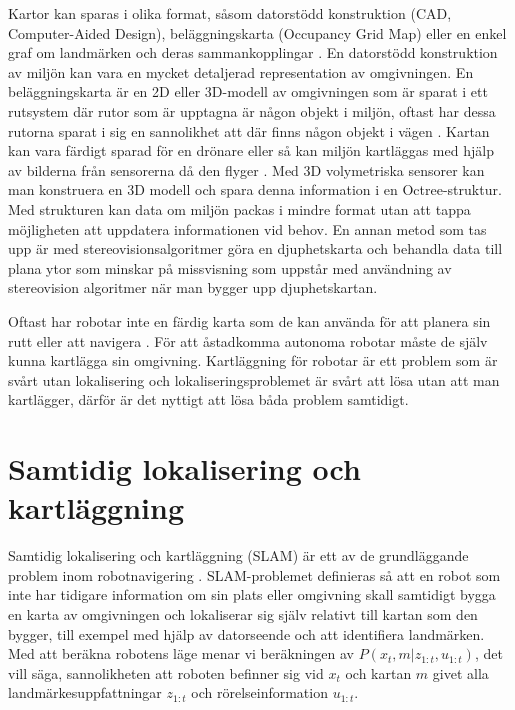 Kartor kan sparas i olika format, såsom datorstödd konstruktion (CAD, Computer-Aided Design), beläggningskarta (Occupancy Grid Map) eller en enkel graf om landmärken och deras sammankopplingar \citep{982903}. En datorstödd konstruktion av miljön kan vara en mycket detaljerad representation av omgivningen. En beläggningskarta är en 2D eller 3D-modell av omgivningen som är sparat i ett rutsystem där rutor som är upptagna är någon objekt i miljön, oftast har dessa rutorna sparat i sig en sannolikhet att där finns någon objekt i vägen \citep{6095058, 982903}. Kartan kan vara färdigt sparad för en drönare eller så kan miljön kartläggas med hjälp av bilderna från sensorerna då den flyger \citep{geospatial}. Med 3D volymetriska sensorer kan man konstruera en 3D modell och spara denna information i en Octree-struktur. Med strukturen kan data om miljön packas i mindre format utan att tappa möjligheten att uppdatera informationen vid behov. En annan metod som tas upp är med stereovisionsalgoritmer göra en djuphetskarta och behandla data till plana ytor som minskar på missvisning som uppstår med användning av stereovision algoritmer när man bygger upp djuphetskartan. 

Oftast har robotar inte en färdig karta som de kan använda för att planera sin rutt eller att navigera \citep{ProbabilisticRobotics}. För att åstadkomma autonoma robotar måste de själv kunna kartlägga sin omgivning. Kartläggning för robotar är ett problem som är svårt utan lokalisering och lokaliseringsproblemet är svårt att lösa utan att man kartlägger, därför är det nyttigt att lösa båda problem samtidigt. 

\chapter{Samtidig lokalisering och kartläggning} \label{slamchap}

Samtidig lokalisering och kartläggning (SLAM) är ett av de grundläggande problem inom robotnavigering \citep{realslamproblem}. SLAM-problemet definieras så att en robot som inte har tidigare information om sin plats eller omgivning skall samtidigt bygga en karta av omgivningen och lokaliserar sig själv relativt till kartan som den bygger, till exempel med hjälp av datorseende och att identifiera landmärken. Med att beräkna robotens läge menar vi beräkningen av $P(x_t, m|z_{1:t}, u_{1:t})$, det vill säga, sannolikheten att roboten befinner sig vid $x_t$ och kartan $m$ givet alla landmärkesuppfattningar $z_{1:t}$ och rörelseinformation $u_{1:t}$. 

